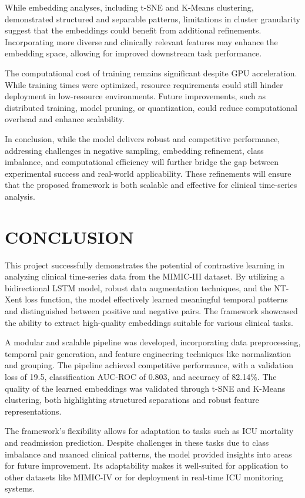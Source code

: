 \documentclass[twocolumn]{article}
\begin{document}
    While embedding analyses, including t-SNE and K-Means clustering,
    demonstrated structured and separable patterns, limitations in cluster granularity
    suggest that the embeddings could benefit from additional refinements.
    Incorporating more diverse and clinically relevant features may enhance the
    embedding space, allowing for improved downstream task performance.

    The computational cost of training remains significant despite GPU acceleration.
    While training times were optimized, resource requirements could still hinder
    deployment in low-resource environments. Future improvements, such as distributed
    training, model pruning, or quantization, could reduce computational
    overhead and enhance scalability.

    In conclusion, while the model delivers robust and competitive performance,
    addressing challenges in negative sampling, embedding refinement, class
    imbalance, and computational efficiency will further bridge the gap between experimental
    success and real-world applicability. These refinements will ensure that the
    proposed framework is both scalable and effective for clinical time-series
    analysis.
    \section{\large CONCLUSION}

    This project successfully demonstrates the potential of contrastive learning
    in analyzing clinical time-series data from the MIMIC-III dataset. By utilizing
    a bidirectional LSTM model, robust data augmentation techniques, and the NT-Xent
    loss function, the model effectively learned meaningful temporal patterns
    and distinguished between positive and negative pairs. The framework showcased
    the ability to extract high-quality embeddings suitable for various clinical
    tasks.

    A modular and scalable pipeline was developed, incorporating data
    preprocessing, temporal pair generation, and feature engineering techniques
    like normalization and grouping. The pipeline achieved competitive performance,
    with a validation loss of 19.5, classification AUC-ROC of 0.803, and
    accuracy of 82.14\%. The quality of the learned embeddings was validated
    through t-SNE and K-Means clustering, both highlighting structured separations
    and robust feature representations.

    The framework’s flexibility allows for adaptation to tasks such as ICU mortality
    and readmission prediction. Despite challenges in these tasks due to class
    imbalance and nuanced clinical patterns, the model provided insights into areas
    for future improvement. Its adaptability makes it well-suited for
    application to other datasets like MIMIC-IV or for deployment in real-time
    ICU monitoring systems.
\end{document}
